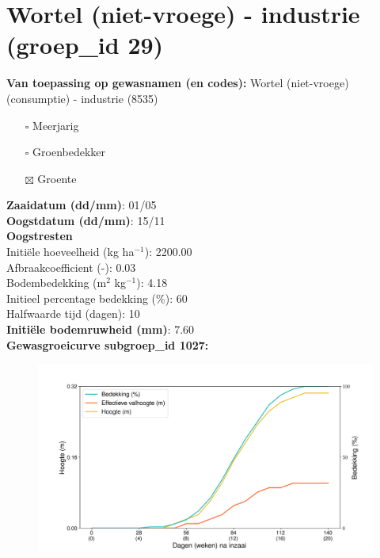 \documentclass{article}
\begin{document}
 \section{Wortel (niet-vroege) - industrie (groep\_id 29)} 
 \textbf{Van toepassing op gewasnamen (en codes):} Wortel (niet-vroege) (consumptie) - industrie (8535) 
 \begin{multicols}{3} \begin{itemize} \item[$\square$] Meerjarig \item[$\square$] Groenbedekker \item[$\boxtimes$] Groente \end{itemize} \end{multicols} 
  \textbf{Zaaidatum (dd/mm)}: 01/05  \vspace{0.10cm} \\ 
  \textbf{Oogstdatum (dd/mm)}: 15/11  \vspace{0.10cm} \\ 
  \textbf{Oogstresten} \vspace{0.05cm} \\ 
  \tab Initi\"{e}le hoeveelheid (kg ha$^{-1}$): 2200.00 \vspace{0.05cm} \\ 
  \tab Afbraakcoefficient (-): 0.03 \vspace{0.05cm} \\ 
  \tab Bodembedekking (m$^2$ kg$^{-1}$): 4.18 \vspace{0.05cm} \\ 
  \tab Initieel percentage bedekking (\%): 60 \vspace{0.05cm} \\ 
  \tab Halfwaarde tijd (dagen): 10 \vspace{0.05cm} \\ 
  \textbf{Initi\"{e}le bodemruwheid (mm)}: 7.60 \vspace{0.05cm} \\ 
  \textbf{Gewasgroeicurve subgroep\_id 1027:} 
 \begin{center} \begin{figure}[H] \includegraphics[width=12.5cm]{temp/1027.png} \end{figure} \end{center} 
\end{document}
